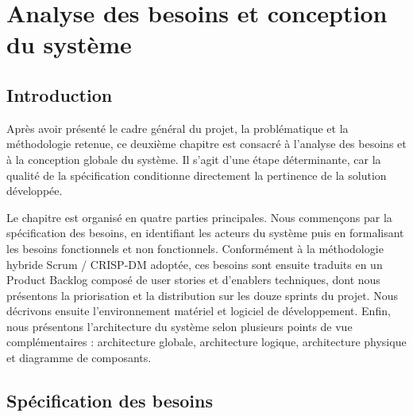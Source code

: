 
\chapter{Analyse des besoins et conception du système}
\label{chap:analyse-conception}
\minitocsection
\newpage

\section*{Introduction}

Après avoir présenté le cadre général du projet, la problématique et la méthodologie retenue, ce deuxième chapitre est consacré à l'analyse des besoins et à la conception globale du système. Il s'agit d'une étape déterminante, car la qualité de la spécification conditionne directement la pertinence de la solution développée.

Le chapitre est organisé en quatre parties principales. Nous commençons par la spécification des besoins, en identifiant les acteurs du système puis en formalisant les besoins fonctionnels et non fonctionnels. Conformément à la méthodologie hybride Scrum / CRISP-DM adoptée, ces besoins sont ensuite traduits en un Product Backlog composé de user stories et d'enablers techniques, dont nous présentons la priorisation et la distribution sur les douze sprints du projet. Nous décrivons ensuite l'environnement matériel et logiciel de développement. Enfin, nous présentons l'architecture du système selon plusieurs points de vue complémentaires : architecture globale, architecture logique, architecture physique et diagramme de composants.

\section{Spécification des besoins}

